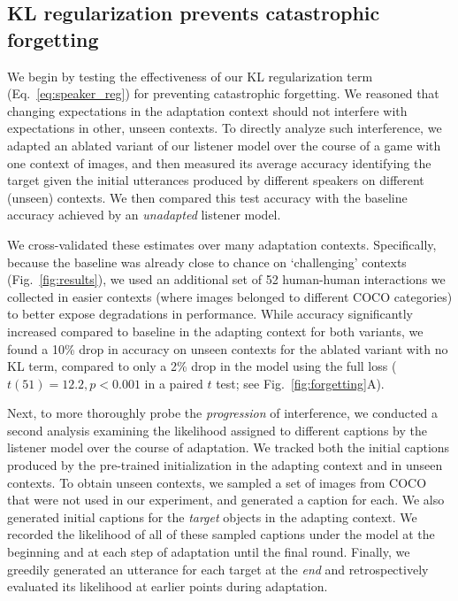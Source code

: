 \documentclass[11pt,a4paper]{article}
\begin{document}
\subsection{KL regularization prevents catastrophic forgetting}
\label{sec:KL_analysis}

We begin by testing the effectiveness of our KL regularization term (Eq.~\ref{eq:speaker_reg}) for preventing catastrophic forgetting.
We reasoned that changing expectations in the adaptation context should not interfere with expectations in other, unseen contexts.
To directly analyze such interference, we adapted an ablated variant of our listener model over the course of a game with one context of images, and then measured its average accuracy identifying the target given the initial utterances produced by different speakers on different (unseen) contexts.
We then compared this test accuracy with the baseline accuracy achieved by an \emph{unadapted} listener model.

We cross-validated these estimates over many adaptation contexts.
Specifically, because the baseline was already close to chance on `challenging' contexts (Fig.\ \ref{fig:results}), we used an additional set of 52 human-human interactions we collected in easier contexts (where images belonged to different COCO categories) to better expose degradations in performance. 
While accuracy significantly increased compared to baseline in the adapting context for both variants, we found a 10\% drop in accuracy on unseen contexts for the ablated variant with no KL term, compared to only a 2\% drop in the model using the full loss ($t(51)=12.2, p <0.001$ in a paired $t$ test; see Fig.\ \ref{fig:forgetting}A).

Next, to more thoroughly probe the \emph{progression} of interference, we conducted a second analysis examining the likelihood assigned to different captions by the listener model over the course of adaptation.
We tracked both the initial captions produced by the pre-trained initialization in the adapting context and in unseen contexts. 
To obtain unseen contexts, we sampled a set of images from COCO that were not used in our experiment, and generated a caption for each.
We also generated initial captions for the \emph{target} objects in the adapting context. %
We recorded the likelihood of all of these sampled captions under the model at the beginning and at each step of adaptation until the final round. 
Finally, we greedily generated an utterance for each target at the \emph{end} and retrospectively evaluated its likelihood at earlier points during adaptation.
\end{document}
